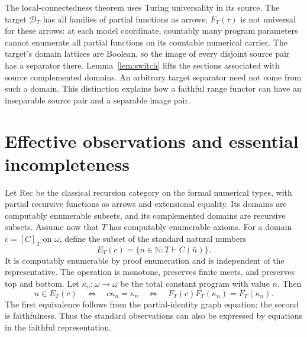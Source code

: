 \documentclass[11pt]{article}
\newcommand{\N}{\mathbb N}
\begin{document}
The local-connectedness theorem uses Turing universality in its source.
The target $\mathcal D_T$ has all families of partial functions as arrows;
$F_T(\tau)$ is not universal for these arrows: at each model coordinate,
countably many program parameters cannot enumerate all partial functions
on its countable numerical carrier. The target's domain lattices are
Boolean, so the image of every disjoint source pair has a separator
there. Lemma~\ref{lem:switch} lifts the sections associated with source
complemented domains. An arbitrary target separator need not come from
such a domain. This distinction explains how a faithful range functor
can have an inseparable source pair and a separable image pair.

\section{Effective observations and essential incompleteness}\label{sec:arithmetic}

Let $\mathrm{Rec}$ be the classical recursion category on the formal
numerical types, with partial recursive functions as arrows and extensional
equality. Its domains are computably enumerable subsets, and its
complemented domains are recursive subsets.
Assume now that $T$ has computably enumerable axioms. For a domain
$c=[C]_T$ on $\omega$, define the subset of the standard natural numbers
\begin{equation}\label{eq:observation}
 E_T(c)=\{n\in\N:T\vdash C(\bar n)\}.
\end{equation}
It is computably enumerable by proof enumeration and is independent of
the representative. The operation is monotone, preserves finite meets,
and preserves top and bottom. Let $\kappa_n:\omega\to\omega$ be the
total constant program with value $n$. Then
\begin{equation}\label{eq:faithful-observation}
 n\in E_T(c)
 \quad\Longleftrightarrow\quad c\kappa_n=\kappa_n
 \quad\Longleftrightarrow\quad
 F_T(c)F_T(\kappa_n)=F_T(\kappa_n).
\end{equation}
The first equivalence follows from the partial-identity graph equation;
the second is faithfulness. Thus the standard observations can also be
expressed by equations in the faithful representation.
\end{document}
